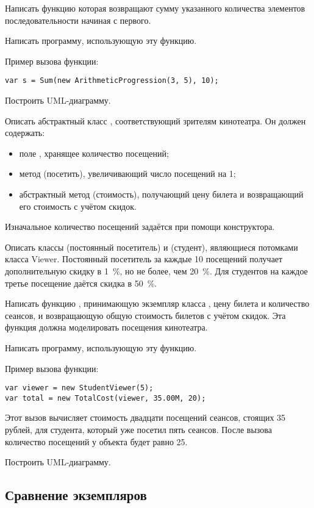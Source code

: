 Написать функцию  которая возвращают сумму указанного
количества элементов последовательности начиная с первого.

Написать программу, использующую эту функцию.

Пример вызова функции:
\begin{lstlisting}[numbers=none]
var s = Sum(new ArithmeticProgression(3, 5), 10);
\end{lstlisting}

Построить UML-диаграмму.

\task Описать абстрактный класс , соответствующий зрителям
кинотеатра. Он должен содержать:
\begin{itemize}
\item поле , хранящее количество посещений;
\item метод  (посетить), увеличивающий число посещений на
  1;
\item абстрактный метод  (стоимость), получающий цену билета
  и возвращающий его стоимость с учётом скидок.
\end{itemize}
Изначальное количество посещений задаётся при помощи конструктора.

Описать классы  (постоянный посетитель) и
 (студент), являющиеся потомками класса
Viewer. Постоянный посетитель за каждые 10 посещений получает
дополнительную скидку в 1~\%, но не более, чем 20~\%. Для студентов на
каждое третье посещение даётся скидка в 50~\%.

Написать функцию , принимающую экземпляр класса
, цену билета и количество сеансов, и возвращающую общую
стоимость билетов с учётом скидок. Эта функция должна моделировать
посещения кинотеатра.

Написать программу, использующую эту функцию.

Пример вызова функции:
\begin{lstlisting}[numbers=none]
var viewer = new StudentViewer(5);
var total = new TotalCost(viewer, 35.00M, 20);
\end{lstlisting}
Этот вызов вычисляет стоимость двадцати посещений сеансов, стоящих 35
рублей, для студента, который уже посетил пять сеансов. После вызова
количество посещений у объекта  будет равно 25.

Построить UML-диаграмму.


\subsection{Сравнение экземпляров}

